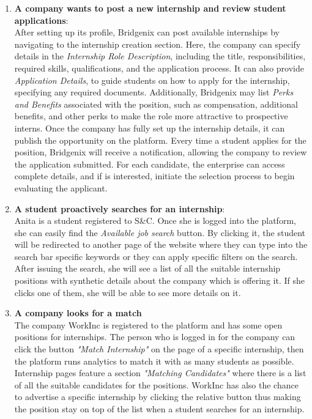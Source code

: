 \begin{enumerate}
\item \textbf{A company wants to post a new internship and review student applications}:
\\After setting up its profile, Bridgenix can post available internships by navigating to the internship creation section. Here, the company can specify details in the \textit{Internship Role Description}, including the title, responsibilities, required skills, qualifications, and the application process.
It can also provide \textit{Application Details}, to guide students on how to apply for the internship, specifying any required documents. Additionally, Bridgenix may list \textit{Perks and Benefits} associated with the position, such as compensation, additional benefits, and other perks to make the role more attractive to prospective interns. Once the company has fully set up the internship details, it can publish the opportunity on the platform. 
Every time a student applies for the position, Bridgenix will receive a notification, allowing the company to review the application submitted. For each candidate, the enterprise can access complete details, and if is interested, initiate the selection process to begin evaluating the applicant.


\item \textbf{A student proactively searches for an internship}:               
\\Anita is a student registered to S\&C. Once she is logged into the platform, she can easily find the \textit{Available job search} button. By clicking it, the student will be redirected to another page of the website where they can type into the search bar specific keywords or they can apply specific filters on the search. After issuing the search, she will see a list of all the suitable internship positions with synthetic details about the company which is offering it. If she clicks one of them, she will be able to see more details on it.

\item \textbf{A company looks for a match}   
\\The company WorkInc is registered to the platform and has some open positions for internships. The person who is logged in for the company can click the button \textit{"Match Internship"} on the page of a specific internship, then the platform runs analytics to match it with as many students as possible. Internship pages feature a section \textit{"Matching Candidates"} where there is a list of all the suitable candidates for the positions. WorkInc has also the chance to advertise a specific internship by clicking the relative button thus making the position stay on top of the list when a student searches for an internship.


\end{enumerate}
